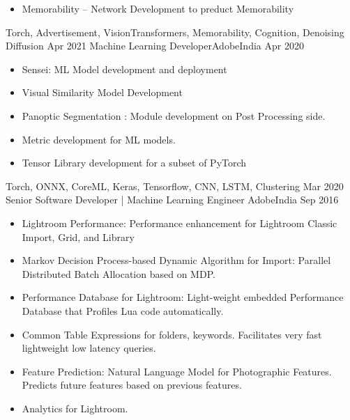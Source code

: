 \begin{experiences}
{\begin{itemize}
			\item Memorability -- Network Development to preduct Memorability
		\end{itemize}
	}
	{Torch, Advertisement,  VisionTransformers,  Memorability, Cognition, Denoising Diffusion}
	\emptySeparator
  \experience
    {Apr 2021}   {Machine Learning Developer}{Adobe}{India}
    {Apr 2020} {
                      \begin{itemize}
                        \item Sensei: ML Model development and deployment
                        \item Visual Similarity Model Development 
                        \item Panoptic Segmentation : Module development on Post Processing side.
                        \item Metric development for ML models.
                        \item Tensor Library development for a subset of PyTorch
                      \end{itemize}
                    }
                    {Torch, ONNX, CoreML, Keras, Tensorflow, CNN, LSTM, Clustering}
  \emptySeparator
  \experience 
  {Mar 2020}
  {Senior Software Developer | Machine Learning Engineer}
  {Adobe}{India}
  {Sep 2016}
  {
  	\begin{itemize}
  	
  	\item Lightroom Performance: Performance enhancement for Lightroom Classic Import, Grid, and Library
  	
  	\item Markov Decision Process-based Dynamic Algorithm for Import: Parallel Distributed Batch Allocation based on MDP.                     
  	
  	\item Performance Database for Lightroom: Light-weight embedded Performance Database that Profiles Lua code automatically.
  	
  	\item Common Table Expressions for folders, keywords. Facilitates very fast lightweight low latency queries.                
  	
  	\item Feature Prediction: Natural Language Model for Photographic Features. Predicts future features based on previous features.
  	
  	\item Analytics for Lightroom.
  	

\end{itemize}}
\end{experiences}
